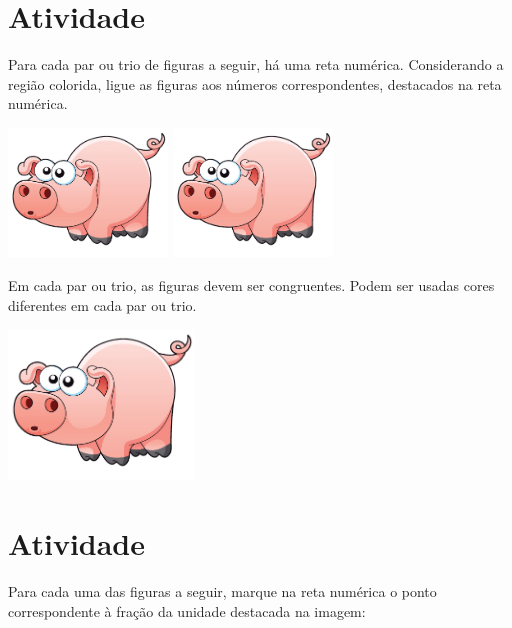 \documentclass[a4,12pt]{book}
\begin{document}
\section{Atividade}








Para cada par ou trio de figuras a seguir, há uma reta numérica. Considerando a região colorida, ligue as figuras aos números correspondentes, destacados na reta numérica.

\includegraphics[width=120pt, keepaspectratio]{pig} \includegraphics[width=120pt, keepaspectratio]{pig}



Em cada par ou trio, as figuras devem ser congruentes. Podem ser usadas cores diferentes em cada par ou trio.





\includegraphics[width=\textwidth,height=4cm, keepaspectratio]{pig}
\section{Atividade}





Para cada uma das figuras a seguir, marque na reta numérica o ponto correspondente à fração da unidade destacada na imagem:
\end{document}
